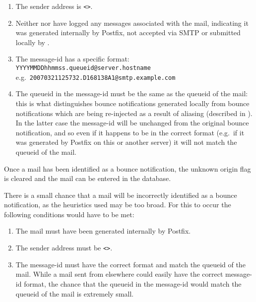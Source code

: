 \begin{enumerate}

    \item The sender address is \verb!<>!.\glsadd{<>}

    \item Neither  nor  have logged any
        messages associated with the mail, indicating it was generated
        internally by Postfix, not accepted via \gls{SMTP} or submitted
        locally by .

    \item The message-id has a specific format: \newline{}
        \tab{} \texttt{YYYYMMDDhhmmss.queueid@server.hostname} \newline{}
        e.g.\ \texttt{20070321125732.D168138A1@smtp.example.com}

    \item The queueid in the message-id must be the same as the queueid of
        the mail: this is what distinguishes bounce notifications generated
        locally from bounce notifications which are being re-injected as a
        result of aliasing (described in ).
        In the latter case the message-id will be unchanged from the
        original bounce notification, and so even if it happens to be in
        the correct format (e.g.\ if it was generated by Postfix on this or
        another server) it will not match the queueid of the mail.

\end{enumerate}

Once a mail has been identified as a bounce notification, the unknown
origin flag is cleared and the mail can be entered in the database.

There is a small chance that a mail will be incorrectly identified as a
bounce notification, as the heuristics used may be too broad.  For this to
occur the following conditions would have to be met:

\begin{enumerate}

    \item The mail must have been generated internally by Postfix.

    \item The sender address must be \verb!<>!.\glsadd{<>}

    \item The message-id must have the correct format and match the queueid
        of the mail.  While a mail sent from elsewhere could easily have
        the correct message-id format, the chance that the queueid in the
        message-id would match the queueid of the mail is extremely small.

\end{enumerate}

